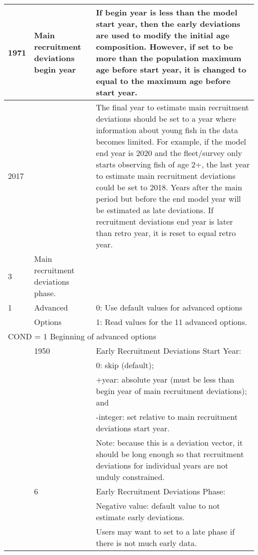 \begin{longtable}{p{1cm} p{3cm} p{11cm}}
	1971 \Tstrut & Main recruitment deviations begin year & If begin year is less than the model start year, then the early deviations are used to modify the initial age composition. However, if set to be more than the population maximum age before start year, it is changed to equal to the maximum age before start year. \Bstrut\\
	\hline

	2017 \Tstrut & \raisebox{0.1\ht\strutbox}{\hypertarget{RecDevEndYear}{Main recruitment deviations end year}} & The final year to estimate main recruitment deviations should be set to a year where information about young fish in the data becomes limited. For example, if the model end year is 2020 and the fleet/survey only starts observing fish of age 2+, the last year to estimate main recruitment deviations could be set to 2018. Years after the main period but before the end model year will be estimated as late deviations. If recruitment deviations end year is later than retro year, it is reset to equal retro year. \Bstrut\\
	\hline

	3 \Tstrut & Main recruitment deviations phase. & \Bstrut\\
	\hline

	1 \Tstrut & Advanced & 0: Use default values for advanced options \\
	  & Options & 1: Read values for the 11 advanced options. \Bstrut\\
	\hline

	\multicolumn{3}{l}{COND = 1 Beginning of advanced options} \Tstrut\Bstrut\\
	& 1950 & Early Recruitment Deviations Start Year: \\
	& & 0: skip (default); \\
	& & +year: absolute year (must be less than begin year of main recruitment deviations); and \\
	& & -integer: set relative to main recruitment deviations start year. \\
	& & Note: because this is a deviation vector, it should be long enough so that recruitment deviations for individual years are not unduly constrained. \\

	\Tstrut & 6 & Early Recruitment Deviations Phase: \\
	& & Negative value: default value to not estimate early deviations. \\
	& & Users may want to set to a late phase if there is not much early data. \\
	

\end{longtable}
